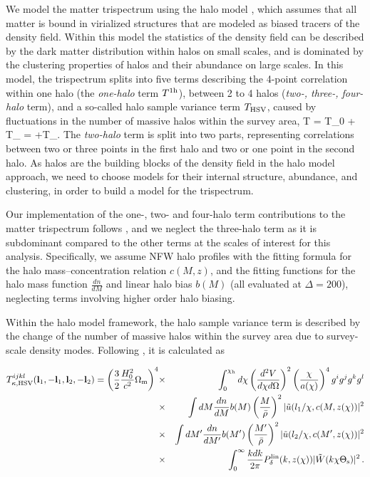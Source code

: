We model the matter trispectrum using the halo model \citep{Seljak00, CS02}, which assumes that all matter is bound in virialized structures that are modeled as biased tracers of the density field. Within this model the statistics of the density field can be described by the dark matter distribution within halos on small scales, and is dominated by the clustering properties of halos and their abundance on large scales. In this model, the trispectrum splits into five terms describing the 4-point correlation within one halo (the \emph{one-halo} term $T^{\mathrm{1h}}$), between 2 to 4 halos (\emph{two-, three-, four-halo} term), and a so-called halo sample variance term $T_{\mathrm{HSV}}$, caused by fluctuations in the number of massive halos within the survey area,
\be
\label{eq:t}
T = T_0 + T_{} = \left[T_{\mr{1h}}+T_{\mr{2h}}+T_{\mr{3h}}+T_{\mr{4h}}\right]+T_{}\;.
\ee
The \emph{two-halo} term is split into two parts, representing correlations between two or three points in the first halo and two or one point in the second halo. As halos are the building blocks of the density field in the halo model approach, we need to choose models for their internal structure, abundance, and clustering, in order to build a model for the trispectrum.


Our implementation of the one-, two- and four-halo term contributions to the matter trispectrum follows \citet{CH01}, and we neglect the three-halo term as it is subdominant compared to the other terms at the scales of interest for this analysis. Specifically, we assume NFW halo profiles \citep{NFW} with the \citet{Bhattacharya11} fitting formula for the halo mass--concentration relation $c(M,z)$, and the \citet{Tinker2008} fitting functions for the halo mass function $\frac{ dn}{dM}$ and linear halo bias $b(M)$ (all evaluated at $\Delta = 200$), neglecting terms involving higher order halo biasing.


Within the halo model framework, the halo sample variance term is described by the change of the number of massive halos within the survey area due to survey-scale density modes. Following \citet{sht09}, it is calculated as

\begin{eqnarray}
T_{\kappa,\rm{HSV}}^{ijkl}(\mathbf l_1,-\mathbf l_1,\mathbf l_2,-\mathbf l_2)= \left(\frac{3}{2}\frac{H_0^2}{c^2}\Omega_{\mathrm m}\right)^4 &\times&  \int_0^{\chi_\mathrm h}d\chi \left(\frac{d^2 V}{d\chi d\Omega}\right)^2 \left(\frac{\chi}{a(\chi)}\right)^4 g^i g^j g^k g^l \nonumber \\
&\times&  \int d M \frac{d n}{d M} b(M)\left(\frac{M}{\bar{\rho}}\right)^2 |\tilde{u}(l_1/\chi, c(M,z(\chi))|^2 \nonumber \\
 &\times& \int d M' \frac{d n}{d M'} b(M')\left(\frac{M'}{\bar{\rho}}\right)^2 |\tilde{u}(l_2/\chi, c(M',z(\chi))|^2 \nonumber \\
 &\times&  \int_0^\infty \frac{k dk}{2\pi}P_\delta^{\mathrm{lin}}(k,z(\chi))|\tilde W(k\chi \Theta_{\mathrm s})|^2 \,.
\end{eqnarray}


